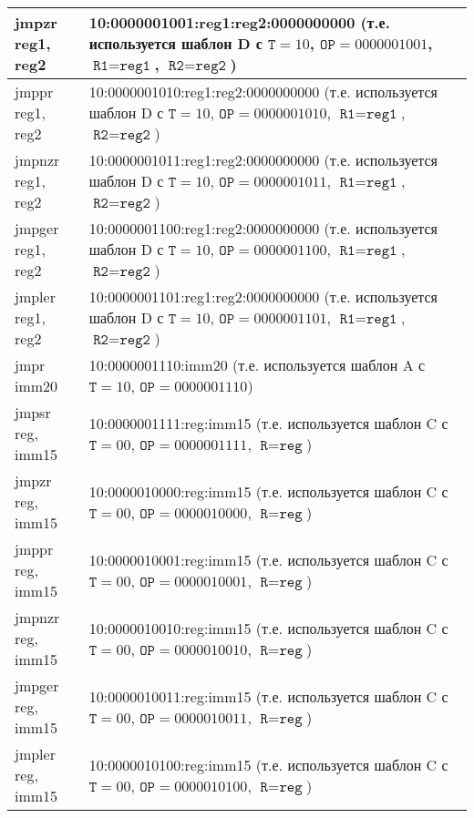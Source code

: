 \documentclass[10pt]{report}
\begin{document}
\begin{longtable}[c]{|l|p{12.5cm}|}
jmpzr reg1, reg2                & 10:0000001001:reg1:reg2:0000000000 (т.е. используется шаблон D с $\texttt{T}=10$, $\texttt{OP}=0000001001$, $\texttt{R1}=\texttt{reg1}$, $\texttt{R2}=\texttt{reg2}$) \\ \hline
jmppr reg1, reg2                & 10:0000001010:reg1:reg2:0000000000 (т.е. используется шаблон D с $\texttt{T}=10$, $\texttt{OP}=0000001010$, $\texttt{R1}=\texttt{reg1}$, $\texttt{R2}=\texttt{reg2}$) \\ \hline
jmpnzr reg1, reg2               & 10:0000001011:reg1:reg2:0000000000 (т.е. используется шаблон D с $\texttt{T}=10$, $\texttt{OP}=0000001011$, $\texttt{R1}=\texttt{reg1}$, $\texttt{R2}=\texttt{reg2}$) \\ \hline
jmpger reg1, reg2               & 10:0000001100:reg1:reg2:0000000000 (т.е. используется шаблон D с $\texttt{T}=10$, $\texttt{OP}=0000001100$, $\texttt{R1}=\texttt{reg1}$, $\texttt{R2}=\texttt{reg2}$) \\ \hline
jmpler reg1, reg2               & 10:0000001101:reg1:reg2:0000000000 (т.е. используется шаблон D с $\texttt{T}=10$, $\texttt{OP}=0000001101$, $\texttt{R1}=\texttt{reg1}$, $\texttt{R2}=\texttt{reg2}$) \\ \hline
jmpr imm20                      & 10:0000001110:imm20 (т.е. используется шаблон A с $\texttt{T}=10$, $\texttt{OP}=0000001110$) \\ \hline
jmpsr reg, imm15                & 10:0000001111:reg:imm15  (т.е. используется шаблон C с $\texttt{T}=00$, $\texttt{OP}=0000001111$, $\texttt{R}=\texttt{reg}$)\\ \hline
jmpzr reg, imm15                & 10:0000010000:reg:imm15  (т.е. используется шаблон C с $\texttt{T}=00$, $\texttt{OP}=0000010000$, $\texttt{R}=\texttt{reg}$)\\ \hline
jmppr reg, imm15                & 10:0000010001:reg:imm15  (т.е. используется шаблон C с $\texttt{T}=00$, $\texttt{OP}=0000010001$, $\texttt{R}=\texttt{reg}$)\\ \hline
jmpnzr reg, imm15               & 10:0000010010:reg:imm15  (т.е. используется шаблон C с $\texttt{T}=00$, $\texttt{OP}=0000010010$, $\texttt{R}=\texttt{reg}$)\\ \hline
jmpger reg, imm15               & 10:0000010011:reg:imm15  (т.е. используется шаблон C с $\texttt{T}=00$, $\texttt{OP}=0000010011$, $\texttt{R}=\texttt{reg}$)\\ \hline
jmpler reg, imm15               & 10:0000010100:reg:imm15  (т.е. используется шаблон C с $\texttt{T}=00$, $\texttt{OP}=0000010100$, $\texttt{R}=\texttt{reg}$)\\ \hline

\end{longtable}
\end{document}
